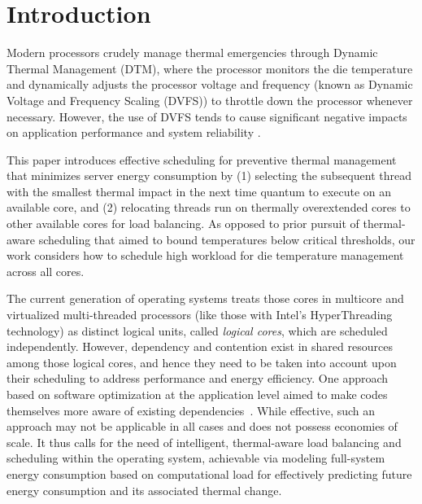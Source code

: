 \documentclass[times, 10pt,twocolumn]{IEEEtran}
\begin{document}
\section{Introduction}
\label{sec:Introduction}
Modern processors crudely manage thermal emergencies through Dynamic
Thermal Management (DTM), where the processor monitors the die
temperature and dynamically adjusts the processor voltage and frequency
(known as Dynamic Voltage and Frequency Scaling (DVFS))
to throttle down the processor whenever necessary. However, the use of
DVFS tends to cause significant negative impacts on application performance
and system reliability \cite{Donald2006,Bircher2008,Coskun2008d}.

This paper introduces effective scheduling for preventive thermal
management that minimizes server energy consumption by (1) 
selecting the subsequent thread with the smallest thermal impact
in the next time quantum to execute on an available core, and (2)
relocating threads run on thermally overextended cores
to other available cores for load balancing.
As opposed to prior pursuit of thermal-aware
scheduling \cite{Gomaa2004,Choi2007,Yang2008,Sarood2011} that 
aimed to bound temperatures below critical thresholds, our work considers
how to schedule high workload for die temperature management across all cores.

The current generation of operating systems treats those cores in 
multicore and virtualized multi-threaded processors (like those with Intel's HyperThreading technology) as distinct logical units, called \textit{logical cores},
which are scheduled independently.
However, dependency and contention exist in shared resources 
among those logical cores, and hence they need to be taken into account 
upon their scheduling to address performance and energy efficiency.
One approach based on software optimization at the application 
level aimed to make codes themselves more aware of existing dependencies~\cite{Khan2011}.
While effective, such an approach may not be applicable in all 
cases and does not possess economies of scale.
It thus calls for the need of intelligent, thermal-aware load 
balancing and scheduling within the operating system,
achievable via modeling full-system energy consumption based on 
computational load for effectively predicting future energy 
consumption and its associated thermal change. 
\end{document}
